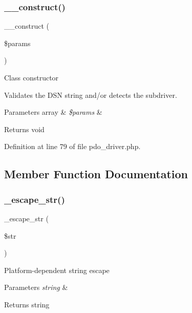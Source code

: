 \subsubsection{\texorpdfstring{\_\_construct()}{\_\_construct()}}
{\footnotesize\ttfamily \+\_\+\+\_\+construct (\begin{DoxyParamCaption}\item[{}]{\$params }\end{DoxyParamCaption})}

Class constructor

Validates the D\+SN string and/or detects the subdriver.


\begin{DoxyParams}[1]{Parameters}
array & {\em \$params} & \\
\hline
\end{DoxyParams}
\begin{DoxyReturn}{Returns}
void 
\end{DoxyReturn}


Definition at line 79 of file pdo\+\_\+driver.\+php.



\subsection{Member Function Documentation}
\mbox{\label{class_c_i___d_b__pdo__driver_af8ef0237bfcdb19215b63fff769e7a55}} 
\subsubsection{\texorpdfstring{\_escape\_str()}{\_escape\_str()}}
{\footnotesize\ttfamily \+\_\+escape\+\_\+str (\begin{DoxyParamCaption}\item[{}]{\$str }\end{DoxyParamCaption})\hspace{0.3cm}{\ttfamily [protected]}}

Platform-\/dependent string escape


\begin{DoxyParams}{Parameters}
{\em string} & \\
\hline
\end{DoxyParams}
\begin{DoxyReturn}{Returns}
string 
\end{DoxyReturn}



